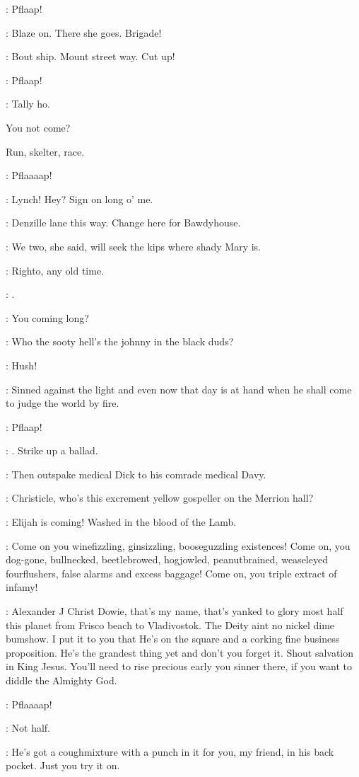 \documentclass[12pt]{article}
\begin{document}
: Pflaap!

\Ln: Blaze on.
There she goes.
Brigade!

\PC: Bout ship.
Mount street way.
Cut up!

: Pflaap!

\Ly: Tally ho.

You not come?

Run, skelter, race.

: Pflaaaap!


\SD: Lynch!
Hey?
Sign on long o' me.

\Ly: Denzille lane this way.
Change here for Bawdyhouse.

\SD: We two, she said, will seek the kips where shady Mary is.

\Ly: Righto, any old time.

\SD: .

\Ly: You coming long?

\SD: Who the sooty hell's the johnny in the black duds?

\Ly: Hush!

\Dw: Sinned against the light and even now that day is at hand
when he shall come to judge the world by fire.

: Pflaap!

\SD: .
Strike up a ballad.

: Then outspake medical Dick to his comrade medical Davy.

\By: Christicle, who's this excrement yellow gospeller on the Merrion hall?

\Dw: Elijah is coming! Washed in the blood of the Lamb.

\Dw: Come on you winefizzling, ginsizzling, booseguzzling existences!
Come on, you dog-gone, bullnecked, beetlebrowed, hogjowled,
peanutbrained, weaseleyed fourflushers, false alarms and excess baggage!
Come on, you triple extract of infamy!

\Dw: Alexander J Christ Dowie, that's my name, that's
yanked to glory most half this planet from Frisco beach to Vladivostok.
The Deity aint no nickel dime bumshow. I put it to you that He's on the
square and a corking fine business proposition. He's the grandest thing
yet and don't you forget it. Shout salvation in King Jesus. You'll need
to rise precious early you sinner there, if you want to diddle the
Almighty God.

: Pflaaaap!

\SD: Not half.

\Dw: He's got a coughmixture with a punch in it for you, my friend,
in his back pocket. Just you try it on.
\end{document}
